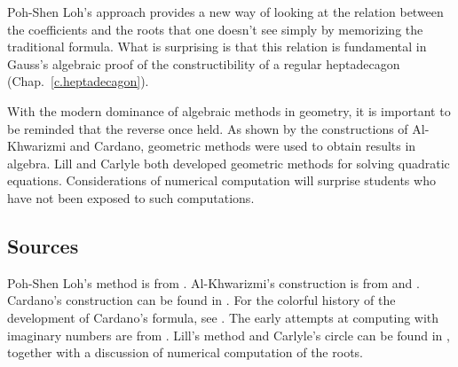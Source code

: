 Poh-Shen Loh's approach provides a new way of looking at the relation between the coefficients and the roots that one doesn't see simply by memorizing the traditional formula. What is surprising is that this relation is fundamental in Gauss's algebraic proof of the constructibility of a regular heptadecagon (Chap.~\ref{c.heptadecagon}).

With the modern dominance of algebraic methods in geometry, it is important to be reminded that the reverse once held. As shown by the constructions of Al-Khwarizmi and Cardano, geometric methods were used to obtain results in algebra. Lill and Carlyle both developed geometric methods for solving quadratic equations. Considerations of numerical computation will surprise students who have not been exposed to such computations.

\subsection*{Sources}
Poh-Shen Loh's method is from \cite{loh1,loh2}. Al-Khwarizmi's construction is from \cite[Chapter~1]{jorg} and \cite{mastin}. Cardano's construction can be found in \cite[Chap.~1]{jorg}. For the colorful history of the development of Cardano's formula, see \cite{wiki:cardano}. The early attempts at computing with imaginary numbers are from \cite[Chapter~2]{jorg}. Lill's method and Carlyle's circle can be found in \cite{wiki:quadratic}, together with a discussion of numerical computation of the roots.
